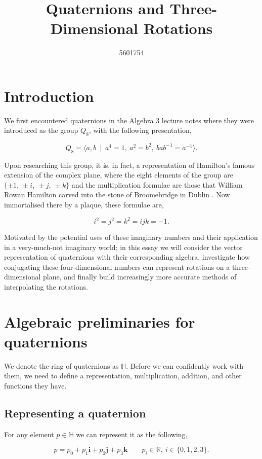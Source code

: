 \documentclass[a4paper, 11pt]{article}
\title{Quaternions and Three-Dimensional Rotations}
\author{5601754}
\begin{document}
\date{}
\maketitle

\section{Introduction}
We first encountered quaternions in the Algebra 3 lecture notes where they were introduced as the group \(Q_8\), with the following presentation, 

    \[Q_8 = \langle a, b\ \mid \ a^4 = 1,\ a^2 = b^2,\ bab^{-1} = a^{-1} \rangle. \]
    
Upon researching this group, it is, in fact, a representation of Hamilton's famous extension of the complex plane, where the eight elements of the group are $\{\pm 1,\ \pm i, \ \pm j, \ \pm k\}$ and the multiplication formulae are those that William Rowan Hamilton carved into the stone of Broomebridge in Dublin \citep[p.~41]{lewis_2006_quaternion}. Now immortalised there by a plaque, these formulae are,

\[i^2 = j^2 = k^2 = ijk = -1.\]

Motivated by the potential uses of these imaginary numbers and their application in a very-much-not imaginary world; in this essay we will consider the vector representation of quaternions with their corresponding algebra, investigate how conjugating these four-dimensional numbers can represent rotations on a three-dimensional plane, and finally build increasingly more accurate methods of interpolating the rotations.

\section{Algebraic preliminaries for quaternions}

We denote the ring of quaternions as $\mathbb{H}$. Before we can confidently work with them, we need to define a representation, multiplication, addition, and other functions they have.

\par
\subsection{Representing a quaternion}
For any element \(p \in \mathbb{H}\) we can represent it as the following, 

\[p =  p_0 + p_1\boldsymbol{i} + p_2\boldsymbol{j} + p_3\boldsymbol{k} \quad \quad p_i \in \mathbb{R} , \ i \in \{ 0,1,2,3 \}.\]
\end{document}
